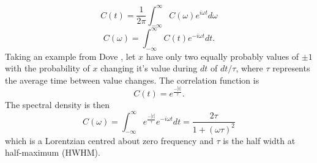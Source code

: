 %
\begin{equation}
C(t)=\frac{1}{2\pi}\int_{-\infty}^{\infty}C(\omega)e^{i\omega t}d\omega
\end{equation}
%
\begin{equation}
C(\omega)=\int_{-\infty}^{\infty}C(t)e^{-i\omega t}dt.
\end{equation}
%
Taking an example from Dove \cite{dove_introduction_1993-3}, let $x$ have only two equally probably values of $\pm 1$ with the probability of $x$ changing it's value during $dt$ of $dt/\tau$, where $\tau$ represents the average time between value changes. The correlation function is
%
\begin{equation}
C(t)=e^{\frac{-|t|}{\tau}}.
\end{equation}
%
The spectral density is then
\begin{equation}
C(\omega)=\int_{-\infty}^{\infty}e^{\frac{-|t|}{\tau}}e^{-i\omega t}dt=\frac{2\tau}{1+(\omega \tau )^2}
\end{equation}
which is a Lorentzian centred about zero frequency and $\tau$ is the half width at half-maximum (HWHM).

